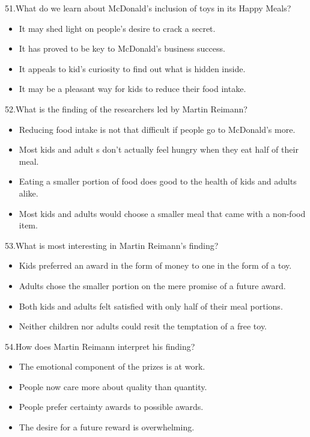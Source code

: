 \documentclass[UTF8,11pt]{ctexart}
\begin{document}
51.What do we learn about McDonald’s inclusion of toys in its Happy Meals?


\begin{itemize}[leftmargin=2em,itemsep=.2em,topsep=.4em]\item[A.] It may shed light on people's desire to crack a secret.
\item[B.] It has proved to be key to McDonald’s business success.
\item[C.] It appeals to kid’s curiosity to find out what is hidden inside.
\item[D.] It may be a pleasant way for kids to reduce their food intake.
\end{itemize}

52.What is the finding of the researchers led by Martin Reimann?


\begin{itemize}[leftmargin=2em,itemsep=.2em,topsep=.4em]\item[A.] Reducing food intake is not that difficult if people go to McDonald’s more.
\item[B.] Most kids and adult s don’t actually feel hungry when they eat half of their meal.
\item[C.] Eating a smaller portion of food does good to the health of kids and adults alike.
\item[D.] Most kids and adults would choose a smaller meal that came with a non-food item.
\end{itemize}

53.What is most interesting in Martin Reimann’s finding?


\begin{itemize}[leftmargin=2em,itemsep=.2em,topsep=.4em]\item[A.] Kids preferred an award in the form of money to one in the form of a toy.
\item[B.] Adults chose the smaller portion on the mere promise of a future award.
\item[C.] Both kids and adults felt satisfied with only half of their meal portions.
\item[D.] Neither children nor adults could resit the temptation of a free toy.
\end{itemize}

54.How does Martin Reimann interpret his finding?


\begin{itemize}[leftmargin=2em,itemsep=.2em,topsep=.4em]\item[A.] The emotional component of the prizes is at work.
\item[B.] People now care more about quality than quantity.
\item[C.] People prefer certainty awards to possible awards.
\item[D.] The desire for a future reward is overwhelming.
\end{itemize}
\end{document}
